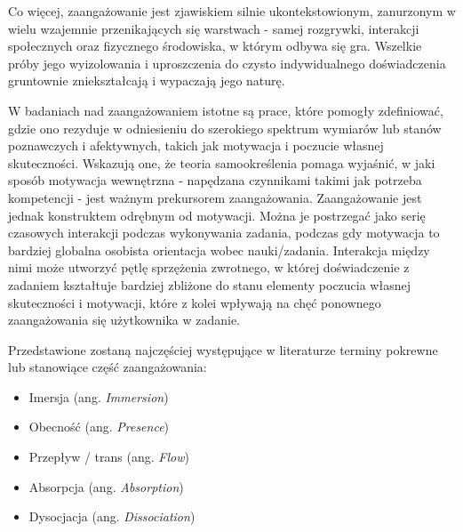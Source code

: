 Co więcej, zaangażowanie jest zjawiskiem silnie ukontekstowionym, zanurzonym w wielu wzajemnie
przenikających się warstwach - samej rozgrywki, interakcji społecznych oraz fizycznego środowiska, w
którym odbywa się gra. Wszelkie próby jego wyizolowania i uproszczenia do czysto indywidualnego
doświadczenia gruntownie zniekształcają i wypaczają jego naturę.

W badaniach nad zaangażowaniem istotne są prace, które pomogły zdefiniować, gdzie ono rezyduje w
odniesieniu do szerokiego spektrum wymiarów lub stanów poznawczych i afektywnych, takich jak motywacja
i poczucie własnej skuteczności. Wskazują one, że teoria samookreślenia pomaga wyjaśnić, w jaki
sposób motywacja wewnętrzna - napędzana czynnikami takimi jak potrzeba kompetencji - jest ważnym
prekursorem zaangażowania. Zaangażowanie jest jednak konstruktem odrębnym od motywacji\cite{measuring_engagement}. Można je
postrzegać jako serię czasowych interakcji podczas wykonywania zadania, podczas gdy motywacja to
bardziej globalna osobista orientacja wobec nauki/zadania. Interakcja między nimi może utworzyć pętlę
sprzężenia zwrotnego, w której doświadczenie z zadaniem kształtuje bardziej zbliżone do stanu elementy
poczucia własnej skuteczności i motywacji, które z kolei wpływają na chęć ponownego zaangażowania się
użytkownika w zadanie\cite{measuring_engagement}.

Przedstawione zostaną najczęściej występujące w literaturze terminy pokrewne lub stanowiące część
zaangażowania:

\begin{itemize}
    \item Imersja (ang. \textit{Immersion})
    \item Obecność (ang. \textit{Presence})
    \item Przepływ / trans  (ang. \textit{Flow})
    \item Absorpcja (ang. \textit{Absorption})
    \item Dysocjacja (ang. \textit{Dissociation})
\end{itemize}

